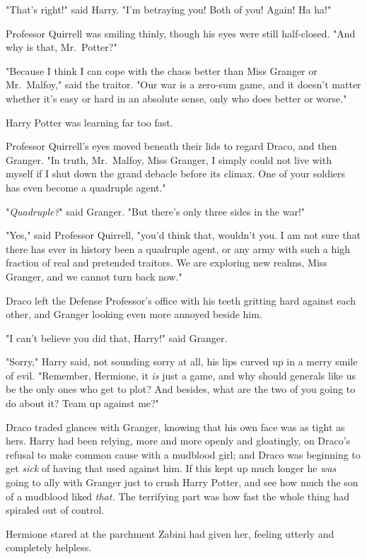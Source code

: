 "That's right!" said Harry. "I'm betraying you! Both of you! Again! Ha ha!"

Professor Quirrell was smiling thinly, though his eyes were still half-closed.
"And why is that, Mr.~Potter?"

"Because I think I can cope with the chaos better than Miss Granger or
Mr.~Malfoy," said the traitor. "Our war is a zero-sum game, and it doesn't
matter whether it's easy or hard in an absolute sense, only who does better or
worse."

Harry Potter was learning far too fast.

Professor Quirrell's eyes moved beneath their lids to regard Draco, and then
Granger. "In truth, Mr.~Malfoy, Miss Granger, I simply could not live with
myself if I shut down the grand debacle before its climax. One of your soldiers
has even become a quadruple agent."

"\emph{Quadruple?}" said Granger. "But there's only three sides in the war!"

"Yes," said Professor Quirrell, "you'd think that, wouldn't you. I am not sure
that there has ever in history been a quadruple agent, or any army with such a
high fraction of real and pretended traitors. We are exploring new realms, Miss
Granger, and we cannot turn back now."

Draco left the Defense Professor's office with his teeth gritting hard against
each other, and Granger looking even more annoyed beside him.

"I can't believe you did that, Harry!" said Granger.

"Sorry," Harry said, not sounding sorry at all, his lips curved up in a merry
smile of evil. "Remember, Hermione, it \emph{is} just a game, and why should
generals like us be the only ones who get to plot? And besides, what are the
two of you going to do about it? Team up against me?"

Draco traded glances with Granger, knowing that his own face was as tight as
hers. Harry had been relying, more and more openly and gloatingly, on Draco's
refusal to make common cause with a mudblood girl; and Draco was beginning to
get \emph{sick} of having that used against him. If this kept up much longer he
\emph{was} going to ally with Granger just to crush Harry Potter, and see how
much the son of a mudblood liked \emph{that.}
\later
The terrifying part was how fast the whole thing had spiraled out of control.

Hermione stared at the parchment Zabini had given her, feeling utterly and
completely helpless.

